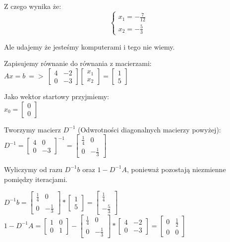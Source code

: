\documentclass{article}
\begin{document}
Z czego wynika że:
\begin{equation*}\begin{cases}
    x_1=-\frac{7}{12}\\
    x_2=-\frac{5}{3}
\end{cases}\end{equation*}

Ale udajemy że jesteśmy komputerami i tego nie wiemy.

Zapisujemy równanie do równania z macierzami:\\
$Ax=b\:=>\:\begin{bmatrix} 4 & -2 \\ 0 & -3 \end{bmatrix} \begin{bmatrix} x_1 \\ x_2 \end{bmatrix} = \begin{bmatrix} 1 \\ 5 \end{bmatrix}$

Jako wektor startowy przyjmiemy:\\
$x_0=\begin{bmatrix} 0 \\ 0 \end{bmatrix}$

Tworzymy macierz $D^{-1}$ (Odwrotności diagonalnych macierzy powyżej):\\
$D^{-1}=\begin{bmatrix} 4 & 0 \\ 0 & -3 \end{bmatrix}^{-1} = \begin{bmatrix} \frac{1}{4} & 0 \\ 0 & -\frac{1}{3} \end{bmatrix}$

Wyliczymy od razu $D^{-1}b$ oraz $1-D^{-1}A$, ponieważ pozostają niezmienne pomiędzy iteracjami.

$D^{-1}b=\begin{bmatrix} \frac{1}{4} & 0 \\ 0 & -\frac{1}{3} \end{bmatrix}*\begin{bmatrix} 1 \\ 5 \end{bmatrix} = \begin{bmatrix} \frac{1}{4} \\ -\frac{5}{3} \end{bmatrix}$\\
$1-D^{-1}A = \begin{bmatrix} 1 & 0 \\ 0 & 1 \end{bmatrix}-\begin{bmatrix} \frac{1}{4} & 0 \\ 0 & -\frac{1}{3} \end{bmatrix}*\begin{bmatrix} 4 & -2 \\ 0 & -3 \end{bmatrix} = \begin{bmatrix} 0 & \frac{1}{2} \\ 0 & 0 \end{bmatrix}$\\
\end{document}
